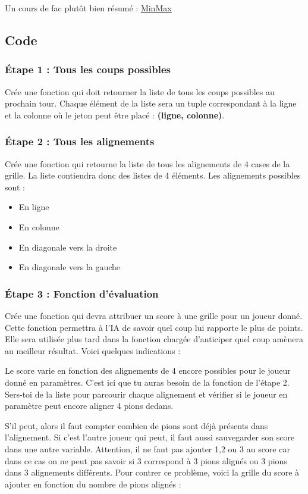 \documentclass[11pt]{article}
\begin{document}
Un cours de fac plutôt bien résumé : \href{./manuel/Minmax.pdf}{MinMax}

\subsection*{Code}
\label{ia_puissance4_code}
\subsubsection*{Étape 1 : Tous les coups possibles}
\label{sec:orgaa85888}
Crée une fonction qui doit retourner la liste de tous les coups possibles au prochain tour. Chaque élément de la liste sera un tuple correspondant à la ligne et la colonne où le jeton peut être placé : \textbf{(ligne, colonne)}.

\subsubsection*{Étape 2 : Tous les alignements}
\label{sec:org67aefe5}
Crée une fonction qui retourne la liste de tous les alignements de 4 cases de la grille. La liste contiendra donc des listes de 4 éléments. Les alignements possibles sont :
\begin{itemize}
\item En ligne
\item En colonne
\item En diagonale vers la droite
\item En diagonale vers la gauche
\end{itemize}

\subsubsection*{Étape 3 : Fonction d'évaluation}
\label{sec:org1b8610b}
Crée une fonction qui devra attribuer un \og score\fg{} à une grille pour un joueur donné. Cette fonction permettra à l'IA de savoir quel coup lui rapporte le plus de points. Elle sera utilisée plus tard dans la fonction chargée d'anticiper quel coup amènera au meilleur résultat.
Voici quelques indications :

Le score varie en fonction des alignements de 4 encore possibles pour le joueur donné en paramètres. C'est ici que tu auras besoin de la fonction de l'étape 2. Sers-toi de la liste pour parcourir chaque alignement et vérifier si le joueur en paramètre peut encore aligner 4 pions dedans.

S'il peut, alors il faut compter combien de pions sont déjà présents dans l'alignement. Si c'est l'autre joueur qui peut, il faut aussi sauvegarder son score dans une autre variable. Attention, il ne faut pas ajouter 1,2 ou 3 au score car dans ce cas on ne peut pas savoir si 3 correspond à 3 pions alignés ou 3 pions dans 3 alignements différents. Pour contrer ce problème, voici la grille du score à ajouter en fonction du nombre de pions alignés :
\end{document}
